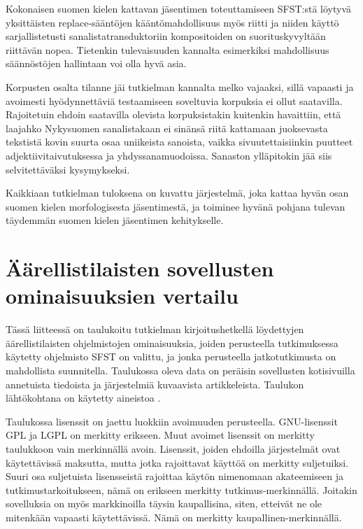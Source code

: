 \documentclass[free]{flammie}
\begin{document}
Kokonaisen suomen kielen kattavan jäsentimen toteuttamiseen SFST:stä löytyvä
yksittäisten replace-sääntöjen kääntömahdollisuus myös riitti ja niiden käyttö sarjallistetusti sanalistatransduktoriin kompositoiden on suorituskyvyltään riittävän
nopea. Tietenkin tulevaisuuden kannalta esimerkiksi mahdollisuus säännöstöjen
hallintaan voi olla hyvä asia.

Korpusten osalta tilanne jäi tutkielman kannalta melko vajaaksi, sillä vapaasti ja
avoimesti hyödynnettäviä testaamiseen soveltuvia korpuksia ei ollut saatavilla.
Rajoitetuin ehdoin saatavilla olevista korpuksistakin kuitenkin havaittiin, että laajahko Nykysuomen sanalistakaan ei sinänsä riitä kattamaan juoksevasta tekstistä
kovin suurta osaa uniikeista sanoista, vaikka sivuutettaisiinkin puutteet adjektiivitaivutuksessa ja yhdyssanamuodoissa. Sanaston ylläpitokin jää siis selvitettäväksi
kysymykseksi.

Kaikkiaan tutkielman tuloksena on kuvattu järjestelmä, joka kattaa hyvän osan
suomen kielen morfologisesta jäsentimestä, ja toiminee hyvänä pohjana tulevan
täydemmän suomen kielen jäsentimen kehitykselle.




\appendix

\section{Äärellistilaisten sovellusten ominaisuuksien vertailu}

Tässä liitteessä on taulukoitu tutkielman kirjoitushetkellä löydettyjen äärellistilaisten ohjelmistojen ominaisuuksia, joiden perusteella tutkimuksessa käytetty ohjelmisto SFST on valittu, ja jonka perusteella jatkotutkimusta on mahdollista suunnitella. Taulukossa oleva data on peräisin sovellusten kotisivuilla annetuista tiedoista ja järjestelmiä kuvaavista artikkeleista. Taulukon lähtökohtana on käytetty
aineistoa \cite{ylijyra2007}.

Taulukossa lisenssit on jaettu luokkiin avoimuuden perusteella. GNU-lisenssit
GPL ja LGPL on merkitty erikseen. Muut avoimet lisenssit on merkitty taulukkoon vain merkinnällä avoin. Lisenssit, joiden ehdoilla järjestelmät ovat käytettävissä maksutta, mutta jotka rajoittavat käyttöä on merkitty suljetuiksi. Suuri osa
suljetuista lisensseistä rajoittaa käytön nimenomaan akateemiseen ja tutkimustarkoitukseen, nämä on erikseen merkitty tutkimus-merkinnällä. Joitakin sovelluksia
on myös markkinoilla täysin kaupallisina, siten, etteivät ne ole mitenkään vapaasti
käytettävissä. Nämä on merkitty kaupallinen-merkinnällä.
\end{document}
